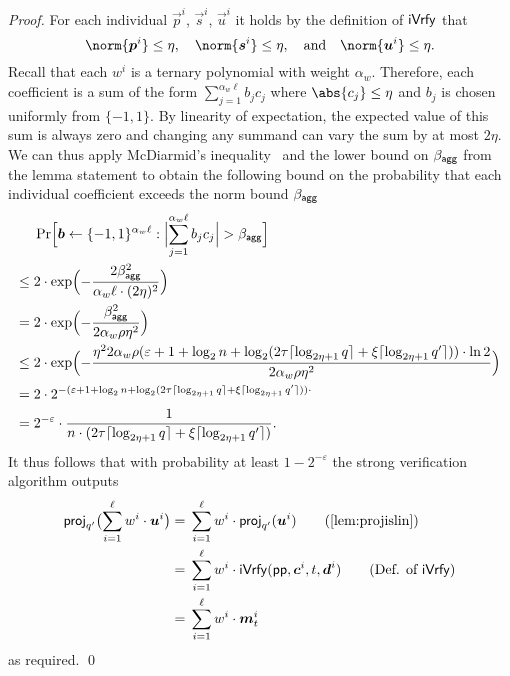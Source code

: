 \begin{proof}
  For each individual $\vec{p}^i$, $\vec{s}^i$, $\vec{u}^i$ it holds by the definition of $\mathsf{iVrfy}$ that
  \[
    \norm{\vec{p}^i} \leq \eta, \quad \norm{\vec{s}^i} \leq \eta,\quad \text{and} \quad\norm{\vec{u}^i}\leq \eta.
  \]
  Recall that each $w^i$ is a ternary polynomial with weight $\alpha_w$.
  Therefore, each coefficient is a sum of the form
  \(
    \sum_{j=1}^{\alpha_w\ell}b_j c_j
  \)
  where $\abs{c_j}\leq \eta$ and $b_j$ is chosen uniformly from $\{-1,1\}$.
  By linearity of expectation, the expected value of this sum is always zero and changing any summand can vary the sum by at most $2\eta$. We can thus apply McDiarmid's inequality~\cite{McDiarmid89} and the lower bound on $\beta_{\mathsf{agg}}$ from the lemma statement to obtain the following bound on the probability that each individual coefficient exceeds the norm bound $\beta_{\mathsf{agg}}$
  \begin{align*}
    &\Pr\Bigl[\vec{b}\gets\{-1,1\}^{\alpha_w\ell} : \Bigl|\smashoperator{\sum_{j=1}^{\alpha_w\ell}}b_j c_j\Bigr| > \bagg\Bigr]\\
    \leq{}& 2\cdot\exp\Bigl(-\frac{2\bagg^2}{\alpha_w\ell\cdot (2\eta)^2}\Bigr)\\
    ={}& 2\cdot\exp\Bigl(-\frac{\bagg^2}{2\alpha_w\rho \eta^2}\Bigr)\\
    \leq{}& 2\cdot\exp\Bigl(-\frac{\eta^2 2\alpha_w\rho(\varepsilon + 1 +\log_2 n + \log_2(2\tau \lceil\log_{2\eta+1}q\rceil + \xi\lceil\log_{2\eta+1}q'\rceil))\cdot\ln2}{2\alpha_w\rho \eta^2}\Bigr)\\
    ={}& 2\cdot 2^{-(\varepsilon + 1 +\log_2 n + \log_2(2\tau \lceil\log_{2\eta+1}q\rceil + \xi\lceil\log_{2\eta+1}q'\rceil))\cdot}\\
    ={}& 2^{-\varepsilon}\cdot\frac{1}{n\cdot(2\tau \lceil\log_{2\eta+1}q\rceil + \xi\lceil\log_{2\eta+1}q'\rceil)}.
  \end{align*}
  It thus follows that with probability at least $1-2^{-\varepsilon}$ the strong verification algorithm outputs
  \begin{align*}
    \proj_{q'}\bigl(\sum_{i=1}^{\ell}w^i \cdot \vec{u}^i\bigr)
    ={}&\sum_{i=1}^{\ell}w^i \cdot \proj_{q'}(\vec{u}^i)\tag{\autoref{lem:projislin}}\\
    ={}&\sum_{i=1}^{\ell}w^i \cdot \iverify(\params,\vec{c}^i,t,\vec{d}^i)\tag{Def. of $\iverify$}\\
    ={}&\sum_{i=1}^{\ell}w^i \cdot \vec{m}_t^i
  \end{align*}
  as required.
  \qed
\end{proof}

